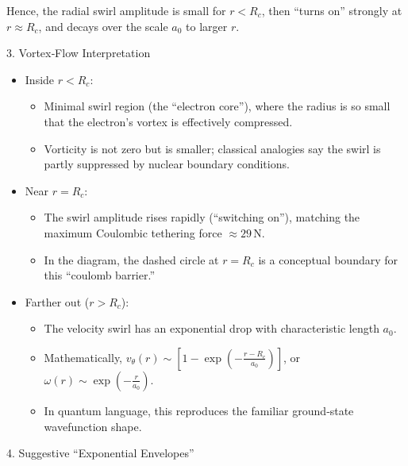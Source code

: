Hence, the radial swirl amplitude is small for \(r < R_c\), then “turns on” strongly at \(r \approx R_c\), and decays over the scale \(a_0\) to larger \(r\).

3. Vortex‐Flow Interpretation

\begin{itemize}
    \item Inside \(r < R_c\):

        \begin{itemize}
            \item Minimal swirl region (the “electron core”), where the radius is so small that the electron’s vortex is effectively compressed.

            \item Vorticity is not zero but is smaller; classical analogies say the swirl is partly suppressed by nuclear boundary conditions.
        \end{itemize}

    \item Near \(r = R_c\):

        \begin{itemize}
            \item The swirl amplitude rises rapidly (“switching on”), matching the maximum Coulombic tethering force \(\approx 29\,\mathrm{N}\).

            \item In the diagram, the dashed circle at \(r = R_c\) is a conceptual boundary for this “coulomb barrier.”
        \end{itemize}

    \item Farther out (\(r > R_c\)):

    \begin{itemize}
        \item The velocity swirl has an exponential drop with characteristic length \(a_0\).

        \item Mathematically, \(v_\theta(r) \sim [1 - \exp(-\frac{r - R_c}{a_0})]\), or \(\omega(r) \sim \exp(-\frac{r}{a_0})\).

        \item In quantum language, this reproduces the familiar ground‐state wavefunction shape.
    \end{itemize}
\end{itemize}




4. Suggestive “Exponential Envelopes”


